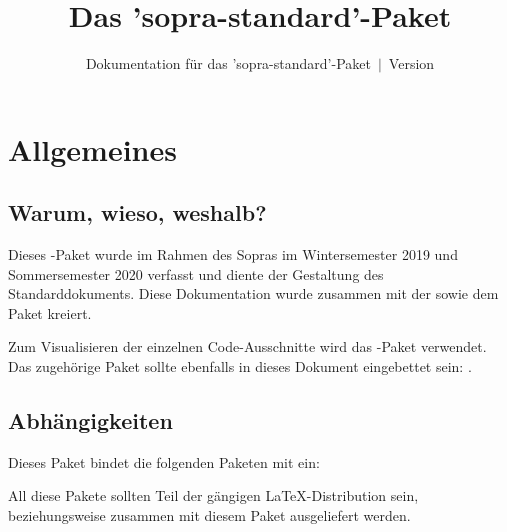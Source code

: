 \documentclass{sopra-base}
\title{Das 'sopra-standard'-Paket}
\subtitle[Dokumentation für das 'sopra-standard'-Paket]{Dokumentation für das 'sopra-standard'-Paket~$\mid$~Version \thesosversion}
\begin{document}
    \maketitle%
%
%

%
%
%
%

\section{Allgemeines}
\subsection{Warum, wieso, weshalb?}
    Dieses \LaTeXe-Paket wurde im Rahmen des Sopras im 
    Wintersemester 2019 und Sommersemester 2020 verfasst und diente der Gestaltung des Standarddokuments. Diese Dokumentation wurde zusammen mit der 
     sowie dem Paket  kreiert.\par
    Zum Visualisieren der einzelnen Code-Ausschnitte wird das
    -Paket verwendet.
    Das zugehörige Paket sollte ebenfalls in dieses Dokument eingebettet sein: .
\subsection{Abhängigkeiten}
    Dieses Paket bindet die folgenden Paketen mit ein:
    \begin{multicols}{4}
    \end{multicols}
    All diese Pakete sollten Teil der gängigen \LaTeX-Distribution sein, beziehungsweise zusammen mit diesem Paket ausgeliefert werden.
\end{document}
